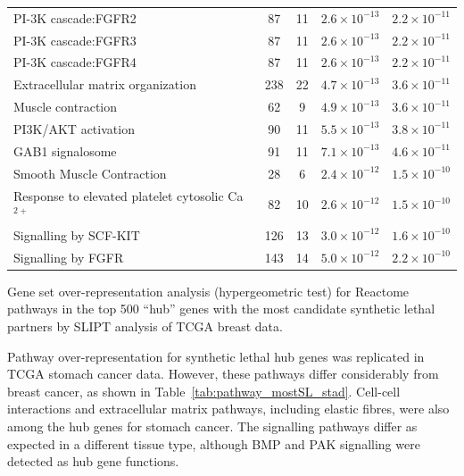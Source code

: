 \begin{table}[!ht]
{\begin{threeparttable}
\begin{tabular}{lcccc}
  \rowcolor{black!5}
  PI-3K cascade:FGFR2 &  87 &  11 & $2.6 \times 10^{-13}$ & $2.2 \times 10^{-11}$ \\ 
  \rowcolor{black!10}
  PI-3K cascade:FGFR3 &  87 &  11 & $2.6 \times 10^{-13}$ & $2.2 \times 10^{-11}$ \\ 
  \rowcolor{black!5}
  PI-3K cascade:FGFR4 &  87 &  11 & $2.6 \times 10^{-13}$ & $2.2 \times 10^{-11}$ \\ 
  \rowcolor{black!10}
  Extracellular matrix organization & 238 &  22 & $4.7 \times 10^{-13}$ & $3.6 \times 10^{-11}$ \\ 
  \rowcolor{black!5}
  Muscle contraction &  62 &   9 & $4.9 \times 10^{-13}$ & $3.6 \times 10^{-11}$ \\ 
  \rowcolor{black!10}
  PI3K/AKT activation &  90 &  11 & $5.5 \times 10^{-13}$ & $3.8 \times 10^{-11}$ \\ 
  \rowcolor{black!5}
  GAB1 signalosome &  91 &  11 & $7.1 \times 10^{-13}$ & $4.6 \times 10^{-11}$ \\ 
  \rowcolor{black!10}
  Smooth Muscle Contraction &  28 &   6 & $2.4 \times 10^{-12}$ & $1.5 \times 10^{-10}$ \\ 
  \rowcolor{black!5}
  Response to elevated platelet cytosolic Ca$^{2+}$ &  82 &  10 & $2.6 \times 10^{-12}$ & $1.5 \times 10^{-10}$ \\ 
  \rowcolor{black!10}
  Signalling by SCF-KIT & 126 &  13 & $3.0 \times 10^{-12}$ & $1.6 \times 10^{-10}$ \\ 
  \rowcolor{black!5}
  Signalling by FGFR & 143 &  14 & $5.0 \times 10^{-12}$ & $2.2 \times 10^{-10}$ \\ 
   \hline
\end{tabular}
\begin{tablenotes}
\raggedright %
Gene set over-representation analysis (hypergeometric test) for Reactome \glspl{pathway} in the top 500 ``hub'' genes with the most candidate \gls{synthetic lethal} partners by \gls{SLIPT} analysis of \gls{TCGA} breast  data.
\end{tablenotes}
\end{threeparttable}
}
\end{table}

Pathway over-representation for \gls{synthetic lethal} hub genes was replicated in \gls{TCGA} stomach cancer  data. However, these \glspl{pathway} differ considerably from breast cancer, as shown in Table~\ref{tab:pathway_mostSL_stad}. Cell-cell interactions and extracellular matrix \glspl{pathway}, including elastic fibres, were also among the hub genes for stomach cancer. The signalling \glspl{pathway} differ as expected in a different tissue type, although BMP and PAK signalling were detected as hub gene functions.
\fi

